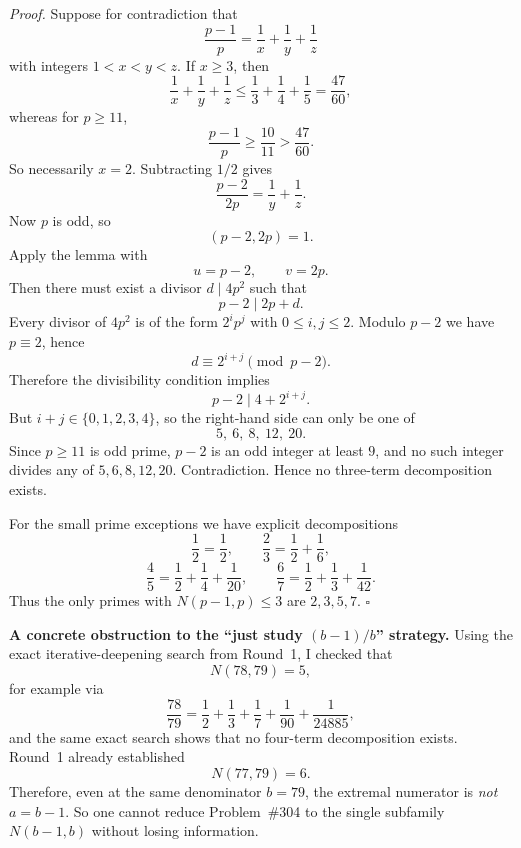 \medskip
\textit{Proof.}
Suppose for contradiction that
\[
  \frac{p-1}{p}=\frac1x+\frac1y+\frac1z
\]
with integers \(1<x<y<z\).
If \(x\ge 3\), then
\[
  \frac1x+\frac1y+\frac1z\le \frac13+\frac14+\frac15=\frac{47}{60},
\]
whereas for \(p\ge 11\),
\[
  \frac{p-1}{p}\ge \frac{10}{11}>\frac{47}{60}.
\]
So necessarily \(x=2\).
Subtracting \(1/2\) gives
\[
  \frac{p-2}{2p}=\frac1y+\frac1z.
\]
Now \(p\) is odd, so
\[
  (p-2,2p)=1.
\]
Apply the lemma with
\[
  u=p-2,
  \qquad
  v=2p.
\]
Then there must exist a divisor \(d\mid 4p^2\) such that
\[
  p-2\mid 2p+d.
\]
Every divisor of \(4p^2\) is of the form \(2^i p^j\) with \(0\le i,j\le 2\).
Modulo \(p-2\) we have \(p\equiv 2\), hence
\[
  d\equiv 2^{i+j}\pmod{p-2}.
\]
Therefore the divisibility condition implies
\[
  p-2\mid 4+2^{i+j}.
\]
But \(i+j\in\{0,1,2,3,4\}\), so the right-hand side can only be one of
\[
  5,\ 6,\ 8,\ 12,\ 20.
\]
Since \(p\ge 11\) is odd prime, \(p-2\) is an odd integer at least \(9\), and no such integer divides any of \(5,6,8,12,20\).
Contradiction.
Hence no three-term decomposition exists.

For the small prime exceptions we have explicit decompositions
\[
  \frac12=\frac12,
  \qquad
  \frac23=\frac12+\frac16,
\]
\[
  \frac45=\frac12+\frac14+\frac1{20},
  \qquad
  \frac67=\frac12+\frac13+\frac1{42}.
\]
Thus the only primes with \(N(p-1,p)\le 3\) are \(2,3,5,7\).
\hfill \(\square\)

\medskip
\textbf{A concrete obstruction to the ``just study \((b-1)/b\)'' strategy.}
Using the exact iterative-deepening search from Round~1, I checked that
\[
  N(78,79)=5,
\]
for example via
\[
  \frac{78}{79}=\frac12+\frac13+\frac17+\frac1{90}+\frac1{24885},
\]
and the same exact search shows that no four-term decomposition exists.
Round~1 already established
\[
  N(77,79)=6.
\]
Therefore, even at the same denominator \(b=79\), the extremal numerator is \emph{not} \(a=b-1\).
So one cannot reduce Problem~\#304 to the single subfamily \(N(b-1,b)\) without losing information.

